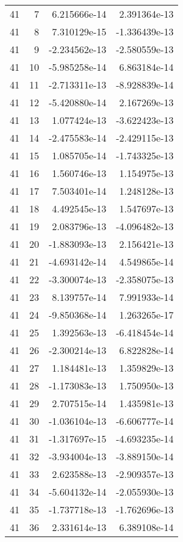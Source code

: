 \begin{tabular}{rrrr}
  41 &    7 &  6.215666e-14 &  2.391364e-13 \\
  41 &    8 &  7.310129e-15 & -1.336439e-13 \\
  41 &    9 & -2.234562e-13 & -2.580559e-13 \\
  41 &   10 & -5.985258e-14 &  6.863184e-14 \\
  41 &   11 & -2.713311e-13 & -8.928839e-14 \\
  41 &   12 & -5.420880e-14 &  2.167269e-13 \\
  41 &   13 &  1.077424e-13 & -3.622423e-13 \\
  41 &   14 & -2.475583e-14 & -2.429115e-13 \\
  41 &   15 &  1.085705e-14 & -1.743325e-13 \\
  41 &   16 &  1.560746e-13 &  1.154975e-13 \\
  41 &   17 &  7.503401e-14 &  1.248128e-13 \\
  41 &   18 &  4.492545e-13 &  1.547697e-13 \\
  41 &   19 &  2.083796e-13 & -4.096482e-13 \\
  41 &   20 & -1.883093e-13 &  2.156421e-13 \\
  41 &   21 & -4.693142e-14 &  4.549865e-14 \\
  41 &   22 & -3.300074e-13 & -2.358075e-13 \\
  41 &   23 &  8.139757e-14 &  7.991933e-14 \\
  41 &   24 & -9.850368e-14 &  1.263265e-17 \\
  41 &   25 &  1.392563e-13 & -6.418454e-14 \\
  41 &   26 & -2.300214e-13 &  6.822828e-14 \\
  41 &   27 &  1.184481e-13 &  1.359829e-13 \\
  41 &   28 & -1.173083e-13 &  1.750950e-13 \\
  41 &   29 &  2.707515e-14 &  1.435981e-13 \\
  41 &   30 & -1.036104e-13 & -6.606777e-14 \\
  41 &   31 & -1.317697e-15 & -4.693235e-14 \\
  41 &   32 & -3.934004e-13 & -3.889150e-14 \\
  41 &   33 &  2.623588e-13 & -2.909357e-13 \\
  41 &   34 & -5.604132e-14 & -2.055930e-13 \\
  41 &   35 & -1.737718e-13 & -1.762696e-13 \\
  41 &   36 &  2.331614e-13 &  6.389108e-14 \\

\end{tabular}
